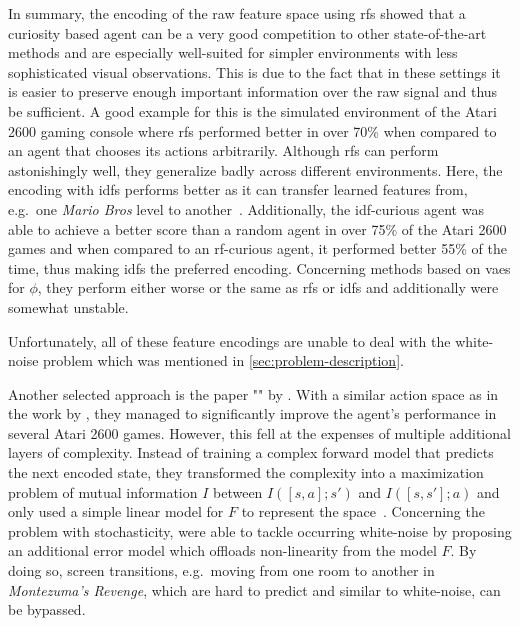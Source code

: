 \documentclass[draft,final]{vutinfth} %
\begin{document}

    In summary, the encoding of the raw feature space using \glspl{rf} showed that a curiosity based agent can be a very good competition to other state-of-the-art methods and are especially well-suited for simpler environments with less sophisticated visual observations.
    This is due to the fact that in these settings it is easier to preserve enough important information over the raw signal and thus be sufficient.
    A good example for this is the simulated environment of the Atari 2600 gaming console where \glspl{rf} performed better in over 70\% when compared to an agent that chooses its actions arbitrarily.
    Although \glspl{rf} can perform astonishingly well, they generalize badly across different environments.
    Here, the encoding with \glspl{idf} performs better as it can transfer learned features from, e.g.\ one \textit{Mario Bros} level to another~\citep{burda_large-scale_2018-1}.
    Additionally, the \gls{idf}-curious agent was able to achieve a better score than a random agent in over 75\% of the Atari 2600 games and when compared to an \gls{rf}-curious agent, it performed better 55\% of the time, thus making \glspl{idf} the preferred encoding.
    Concerning methods based on \glspl{vae} for $\phi$, they perform either worse or the same as \glspl{rf} or \glspl{idf} and additionally were somewhat unstable.

    Unfortunately, all of these feature encodings are unable to deal with the white-noise problem which was mentioned in \autoref{sec:problem-description}.

    Another selected approach is the paper "" by \citet{kim_emi_2019}.
    With a similar action space as in the work by \citet{pathak_curiosity-driven_2017-1}, they managed to significantly improve the agent's performance in several Atari 2600 games.
    However, this fell at the expenses of multiple additional layers of complexity.
    Instead of training a complex forward model that predicts the next encoded state, they transformed the complexity into a maximization problem of mutual information $I$ between $I([s,a];s')$ and $I([s,s'];a)$ and only used a simple linear model for $F$ to represent the space~\citep{aubret_survey_2019}.
    Concerning the problem with stochasticity, \citet{kim_emi_2019} were able to tackle occurring white-noise by proposing an additional error model which offloads non-linearity from the model $F$.
    By doing so, screen transitions, e.g.\ moving from one room to another in \textit{Montezuma's Revenge}, which are hard to predict and similar to white-noise, can be bypassed.
\end{document}

